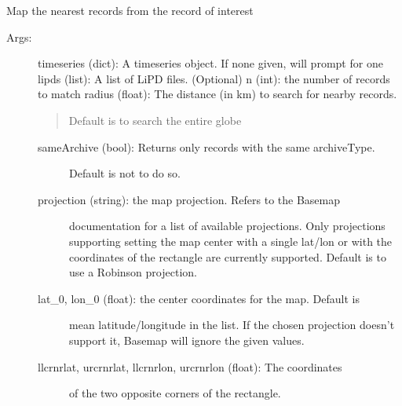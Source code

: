 \documentclass[letterpaper,10pt,english]{sphinxmanual}
\begin{document}

\begin{fulllineitems}
\label{\detokenize{Main:pyleoclim.mapNearRecords}}
Map the nearest records from the record of interest
\begin{description}
\item[{Args:}] \leavevmode
timeseries (dict): A timeseries object. If none given, will prompt for one
lipds (list): A list of LiPD files. (Optional)
n (int): the number of records to match
radius (float): The distance (in km) to search for nearby records.
\begin{quote}

Default is to search the entire globe
\end{quote}
\begin{description}
\item[{sameArchive (bool): Returns only records with the same archiveType.}] \leavevmode
Default is not to do so.

\item[{projection (string): the map projection. Refers to the Basemap}] \leavevmode
documentation for a list of available projections. Only projections
supporting setting the map center with a single lat/lon or with
the coordinates of the rectangle are currently supported. 
Default is to use a Robinson projection.

\item[{lat\_0, lon\_0 (float): the center coordinates for the map. Default is}] \leavevmode
mean latitude/longitude in the list. 
If the chosen projection doesn’t support it, Basemap will
ignore the given values.

\item[{llcrnrlat, urcrnrlat, llcrnrlon, urcrnrlon (float): The coordinates}] \leavevmode
of the two opposite corners of the rectangle.

\end{description}


\end{description}
\end{fulllineitems}
\end{document}
